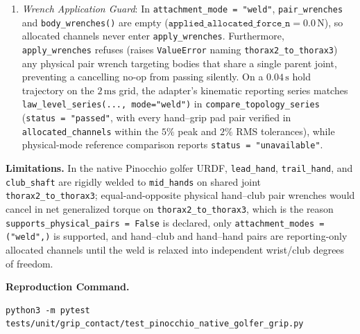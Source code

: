 \documentclass[11pt,a4paper]{article}
\begin{document}
\begin{enumerate}[leftmargin=*,noitemsep]
\item \textit{Wrench Application Guard}: In \texttt{attachment\_mode = "weld"}, \texttt{pair\_wrenches} and \texttt{body\_wrenches()} are empty ($\texttt{applied\_allocated\_force\_n} = 0.0\,\mathrm{N}$), so allocated channels never enter \texttt{apply\_wrenches}. Furthermore, \texttt{apply\_wrenches} refuses (raises \texttt{ValueError} naming \texttt{thorax2\_to\_thorax3}) any physical pair wrench targeting bodies that share a single parent joint, preventing a cancelling no-op from passing silently. On a $0.04\,\mathrm{s}$ hold trajectory on the $2\,\mathrm{ms}$ grid, the adapter's kinematic reporting series matches \texttt{law\_level\_series(..., mode="weld")} in \texttt{compare\_topology\_series} (\texttt{status = "passed"}, with every hand--grip pad pair verified in \texttt{allocated\_channels} within the $5\%$ peak and $2\%$ RMS tolerances), while physical-mode reference comparison reports \texttt{status = "unavailable"}.
\end{enumerate}

\textbf{Limitations.}
In the native Pinocchio golfer URDF, \texttt{lead\_hand}, \texttt{trail\_hand}, and \texttt{club\_shaft} are rigidly welded to \texttt{mid\_hands} on shared joint \texttt{thorax2\_to\_thorax3}; equal-and-opposite physical hand--club pair wrenches would cancel in net generalized torque on \texttt{thorax2\_to\_thorax3}, which is the reason \texttt{supports\_physical\_pairs = False} is declared, only \texttt{attachment\_modes = ("weld",)} is supported, and hand--club and hand--hand pairs are reporting-only allocated channels until the weld is relaxed into independent wrist/club degrees of freedom.

\textbf{Reproduction Command.}
\begin{verbatim}
python3 -m pytest tests/unit/grip_contact/test_pinocchio_native_golfer_grip.py
\end{verbatim}
\end{document}
